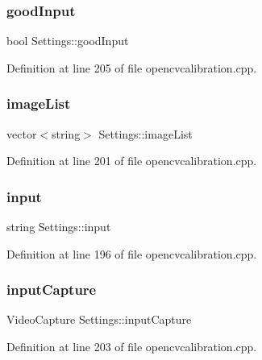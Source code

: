 \subsubsection{\texorpdfstring{goodInput}{goodInput}}
{\footnotesize\ttfamily bool Settings\+::good\+Input}



Definition at line 205 of file opencvcalibration.\+cpp.

\mbox{\label{classSettings_ae261128a69d1d3d2b0f5315aff8066c8}} 
\subsubsection{\texorpdfstring{imageList}{imageList}}
{\footnotesize\ttfamily vector$<$string$>$ Settings\+::image\+List}



Definition at line 201 of file opencvcalibration.\+cpp.

\mbox{\label{classSettings_a9970d51ab47b6560ab11b267637b6219}} 
\subsubsection{\texorpdfstring{input}{input}}
{\footnotesize\ttfamily string Settings\+::input}



Definition at line 196 of file opencvcalibration.\+cpp.

\mbox{\label{classSettings_abd5706146b34d3c32aef4025dcd2ec1b}} 
\subsubsection{\texorpdfstring{inputCapture}{inputCapture}}
{\footnotesize\ttfamily Video\+Capture Settings\+::input\+Capture}



Definition at line 203 of file opencvcalibration.\+cpp.

\mbox{\label{classSettings_a89fb14ce9856fb642f18bb0f7c5b8868}} 
